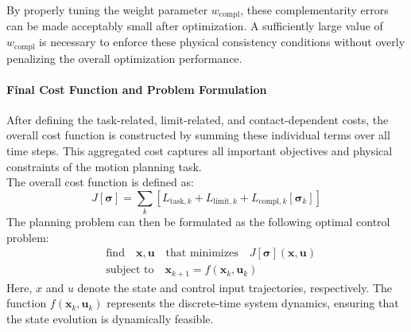\documentclass[main.tex]{subfiles}
\begin{document}
By properly tuning the weight parameter $w_{\text{compl}}$, these complementarity errors can be made acceptably small after optimization. A sufficiently large value of $w_{\text{compl}}$ is necessary to enforce these physical consistency conditions without overly penalizing the overall optimization performance.
\paragraph{Final Cost Function and Problem Formulation}
After defining the task-related, limit-related, and contact-dependent costs, the overall cost function is constructed by summing these individual terms over all time steps. This aggregated cost captures all important objectives and physical constraints of the motion planning task.
\\
The overall cost function is defined as:
\begin{equation}
J[\boldsymbol{\sigma}] = \sum_k \left[ L_{\text{task},k} + L_{\text{limit},k} + L_{\text{compl},k}[\boldsymbol{\sigma}_k] \right]
\end{equation}
The planning problem can then be formulated as the following optimal control problem:
\begin{equation}
\begin{aligned}
& \text{find} \quad \mathbf{x}, \mathbf{u} \quad \text{that minimizes} \quad J[\boldsymbol{\sigma}](\mathbf{x},\mathbf{u}) \\
& \text{subject to} \quad \mathbf{x}_{k+1} = f(\mathbf{x}_k, \mathbf{u}_k)
\end{aligned}
\end{equation}
Here, $x$ and $u$ denote the state and control input trajectories, respectively. The function $f(\mathbf{x}_k, \mathbf{u}_k)$ represents the discrete-time system dynamics, ensuring that the state evolution is dynamically feasible.
\begin{comment}
This problem is formulated using a \textit{single shooting} approach, where the control inputs are directly optimized and the states are obtained by integrating the system dynamics forward in time. 
Due to the nonlinearities in the cost terms (especially those involving contact forces and constraints) and the system dynamics, the resulting optimization is generally a \textit{nonlinear programming problem} (NLP). However, in certain cases where the dynamics and cost functions are affine and the constraints are quadratic, the problem structure could be approximated as a \textit{quadratic programming} (QP) problem to enable faster computation.
Overall, the optimization simultaneously enforces task tracking, physical feasibility, and complementarity conditions related to contact interactions throughout the planned motion.
\end{comment}
\end{document}
